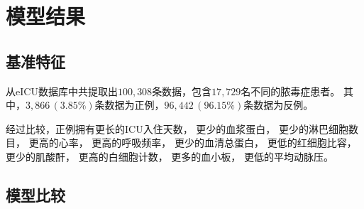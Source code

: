\section{模型结果}

\NewDocumentCommand{}

\subsection{基准特征}

从eICU数据库中共提取出$100,308$条数据，包含$17,729$名不同的脓毒症患者。%
其中，$3,866\,(3.85\%)$条数据为正例，$96,442\,(96.15\%)$条数据为反例。

经过比较，正例拥有更长的ICU入住天数，%
更少的血浆蛋白，%
更少的淋巴细胞数目，%
更高的心率，%
更高的呼吸频率，%
更少的血清总蛋白，%
更低的红细胞比容，%
更少的肌酸酐，%
更高的白细胞计数，%
更多的血小板，%
更低的平均动脉压。

\subsection{模型比较}

